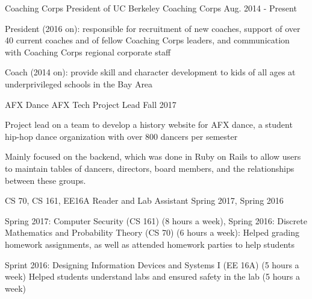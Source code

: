 \begin{cventries}
  \cventry
    {Coaching Corps} %
    {President of UC Berkeley Coaching Corps} %
    {Aug. 2014 - Present} %
    {} %
    {
      \begin{cvitems} %
        \item {President (2016 on): responsible for recruitment of new coaches, support of over 40 current coaches and of fellow Coaching Corps leaders, and communication with Coaching Corps regional corporate staff}
        \item {Coach (2014 on): provide skill and character development to kids of all ages at underprivileged schools in the Bay Area}
      \end{cvitems}
    }
   \cventry
    {AFX Dance} %
    {AFX Tech Project Lead} %
    {Fall 2017} %
    {} %
    {
      \begin{cvitems} %
        \item {Project lead on a team to develop a history website for AFX dance, a student hip-hop dance organization with over 800 dancers per semester}
        \item {Mainly focused on the backend, which was done in Ruby on Rails to allow users to maintain tables of dancers, directors, board members, and the relationships between these groups.}
      \end{cvitems}
     }
  \cventry
    {CS 70, CS 161, EE16A} %
    {Reader and Lab Assistant} %
    {Spring 2017, Spring 2016} %
    {} %
    {
      \begin{cvitems} %
        \item {Spring 2017: Computer Security (CS 161) (8 hours a week), Spring 2016: Discrete Mathematics and Probability Theory (CS 70) (6 hours a week): Helped grading homework assignments, as well as attended homework parties to help students}
         \item {Sprint 2016: Designing Information Devices and Systems I (EE 16A) (5 hours a week) Helped students understand labs and ensured safety in the lab (5 hours a week)}
      \end{cvitems}
    }


\end{cventries}
